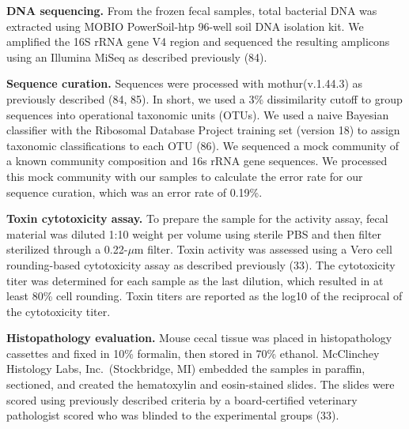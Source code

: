 \documentclass[
  12pt,
]{article}
\begin{document}
\textbf{DNA sequencing.} From the frozen fecal samples, total bacterial
DNA was extracted using MOBIO PowerSoil-htp 96-well soil DNA isolation
kit. We amplified the 16S rRNA gene V4 region and sequenced the
resulting amplicons using an Illumina MiSeq as described previously
(84).

\textbf{Sequence curation.} Sequences were processed with
mothur(v.1.44.3) as previously described (84, 85). In short, we used a
3\% dissimilarity cutoff to group sequences into operational taxonomic
units (OTUs). We used a naive Bayesian classifier with the Ribosomal
Database Project training set (version 18) to assign taxonomic
classifications to each OTU (86). We sequenced a mock community of a
known community composition and 16s rRNA gene sequences. We processed
this mock community with our samples to calculate the error rate for our
sequence curation, which was an error rate of 0.19\%.

\textbf{Toxin cytotoxicity assay.} To prepare the sample for the
activity assay, fecal material was diluted 1:10 weight per volume using
sterile PBS and then filter sterilized through a 0.22-\(\mu\)m filter.
Toxin activity was assessed using a Vero cell rounding-based
cytotoxicity assay as described previously (33). The cytotoxicity titer
was determined for each sample as the last dilution, which resulted in
at least 80\% cell rounding. Toxin titers are reported as the log10 of
the reciprocal of the cytotoxicity titer.

\textbf{Histopathology evaluation.} Mouse cecal tissue was placed in
histopathology cassettes and fixed in 10\% formalin, then stored in 70\%
ethanol. McClinchey Histology Labs, Inc.~(Stockbridge, MI) embedded the
samples in paraffin, sectioned, and created the hematoxylin and
eosin-stained slides. The slides were scored using previously described
criteria by a board-certified veterinary pathologist scored who was
blinded to the experimental groups (33).
\end{document}
